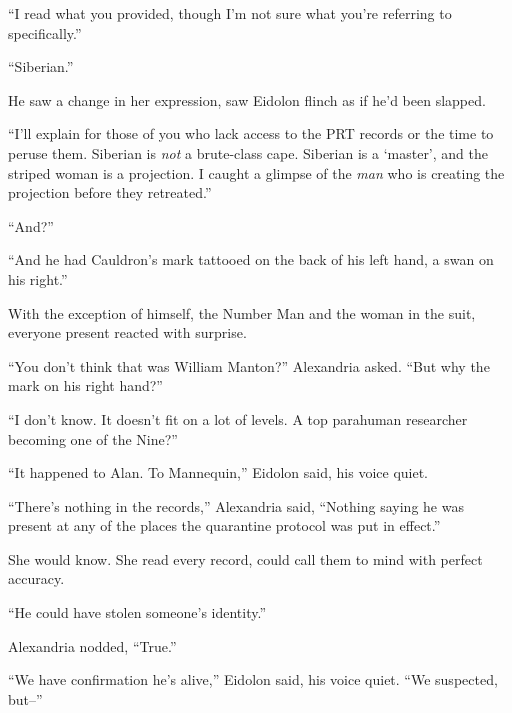 ``I read what you provided, though I'm not sure what you're referring to specifically.''



``Siberian.''



He saw a change in her expression, saw Eidolon flinch as if he'd been slapped.



``I'll explain for those of you who lack access to the PRT records or the time to peruse them.  Siberian is \emph{not} a brute-class cape.  Siberian is a `master', and the striped woman is a projection.  I caught a glimpse of the \emph{man }who is creating the projection before they retreated.''



``And?''



``And he had Cauldron's mark tattooed on the back of his left hand, a swan on his right.''



With the exception of himself, the Number Man and the woman in the suit, everyone present reacted with surprise.



``You don't think that was William Manton?''  Alexandria asked.  ``But why the mark on his right hand?''



``I don't know.  It doesn't fit on a lot of levels.  A top parahuman researcher becoming one of the Nine?''



``It happened to Alan.  To Mannequin,'' Eidolon said, his voice quiet.



``There's nothing in the records,'' Alexandria said, ``Nothing saying he was present at any of the places the quarantine protocol was put in effect.''



She would know.  She read every record, could call them to mind with perfect accuracy.



``He could have stolen someone's identity.''



Alexandria nodded, ``True.''



``We have confirmation he's alive,'' Eidolon said, his voice quiet.  ``We suspected, but--''



